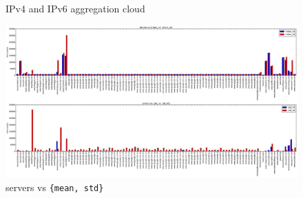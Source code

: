 \begin{figure}
  \begin{minipage}[h]{0.50\textwidth}
    \centering
  \end{minipage}
  \begin{minipage}[h]{0.50\textwidth}
    \centering
  \end{minipage}
\caption{\label{fig:v4-v6-cloud}IPv4 and IPv6 aggregation cloud}
\end{figure}

\begin{figure}[t]
\centering
\includegraphics*[width=1.0\linewidth]{figures/happy-servers-mean-std}
\caption{servers vs \texttt{\{mean, std\}}}
\label{fig:v6cloud}
\end{figure}
